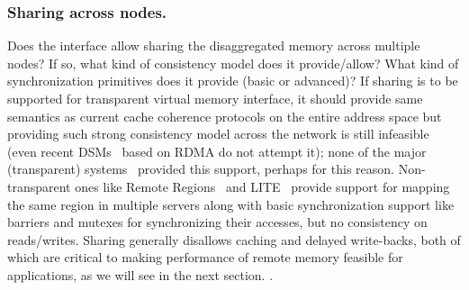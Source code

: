 \subsubsection{Sharing across nodes.} Does the interface allow 
sharing the disaggregated memory across multiple nodes? If so, 
what kind of consistency model does it provide/allow? What 
kind of synchronization primitives does it provide (basic 
or advanced)? If sharing is to be supported for transparent virtual 
memory interface, it should provide same semantics as current 
cache coherence protocols on the entire address space but 
providing such strong consistency model across the network 
is still infeasible (even recent DSMs~\cite{farm,gam} based on 
RDMA do not attempt it); none of the major (transparent) systems~\cite{infiniswap,legoos} provided this support, perhaps for 
this reason. Non-transparent ones like 
Remote Regions~\cite{remregions} and LITE~\cite{literdma} provide
support for mapping the same region in multiple servers along with
basic synchronization support like barriers and mutexes for 
synchronizing their accesses, but no consistency on reads/writes. 
Sharing generally disallows caching and delayed write-backs,
both of which are critical to making performance of remote memory 
feasible for applications, as we will see in the next section.
.